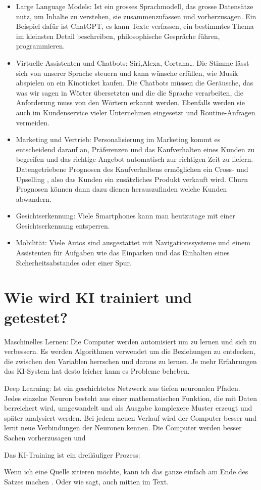 \documentclass{report}
\begin{document}
\begin{itemize}
    \item Large Language Models: Ist ein grosses Sprachmodell, das grosse Datensätze nutz, um Inhalte zu verstehen, sie zusammenzufassen und vorherzusagen. Ein Beispiel dafür ist ChatGPT, es kann Texte verfassen, ein bestimmtes Thema im kleinsten Detail beschreiben, philosophische Gespräche führen, programmieren.
    \item Virtuelle Assistenten und Chatbots: Siri,Alexa, Cortana… Die Stimme lässt sich von unserer Sprache steuern und kann wünsche erfüllen, wie Musik abspielen on ein Kinoticket kaufen. Die Chatbots müssen die Geräusche, das was wir sagen in Wörter übersetzten und die die Sprache verarbeiten, die Anforderung muss von den Wörtern erkannt werden. Ebenfalls werden sie auch im Kundenservice vieler Unternehmen eingesetzt und Routine-Anfragen vermeiden.
    \item Marketing und Vertrieb: Personalisierung im Marketing kommt es entscheidend darauf an, Präferenzen und das Kaufverhalten eines Kunden zu begreifen und das richtige Angebot automatisch zur richtigen Zeit zu liefern. Datengetriebene Prognosen des Kaufverhaltens ermöglichen ein Cross- und Upselling , also das  Kunden ein zusätzliches Produkt verkauft wird. Churn Prognosen können dann dazu dienen herauszufinden welche Kunden abwandern.
    \item Gesichtserkennung: Viele Smartphones kann man heutzutage mit einer Gesichtserkennung entsperren.
    \item Mobilität: Viele Autos sind ausgestattet mit Navigationssysteme und einem Assistenten für Aufgaben wie das Einparken und das Einhalten eines Sicherheitsabstandes oder einer Spur.
    
\end{itemize}





\section{Wie wird KI trainiert und getestet?}

Maschinelles Lernen:
Die Computer werden automisiert um zu lernen und sich zu verbessern. Es werden Algorithmen verwendet um die Beziehungen zu entdecken, die zwischen den Variablen herrschen und daraus zu lernen. Je mehr Erfahrungen das KI-System hat desto leicher kann es Probleme beheben.

Deep Learning:
Ist ein geschichtetes Netzwerk aus tiefen neuronalen Pfaden. Jedes einzelne Neuron besteht aus einer mathematischen Funktion, die mit Daten berreichert wird, umgewandelt und als Ausgabe komplexere Muster erzeugt und später  analysiert werden.
Bei jedem neuen Verlauf wird der Computer besser und lernt neue Verbindungen der Neuronen kennen. Die Computer werden besser Sachen vorherzusagen und   
 
Das KI-Training ist ein dreiläufiger Prozess:

 

Wenn ich eine Quelle zitieren möchte, kann ich das ganze einfach am Ende des Satzes machen \citep{example}. Oder wie \citet{example} sagt, auch mitten im Text.

\printbibliography
\end{document}
